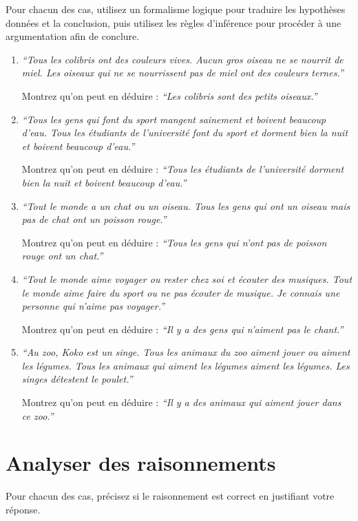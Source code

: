 \documentclass[a4paper,11pt]{article}
\begin{document}
Pour chacun des cas, utilisez un formalisme logique pour traduire les hypothèses données et la conclusion, puis utilisez les règles d'inférence pour procéder à une argumentation afin de conclure.

\begin{enumerate}
\item \emph{``Tous les colibris ont des couleurs vives. Aucun gros oiseau ne se nourrit de miel. Les oiseaux qui ne se nourrissent pas de miel ont des couleurs ternes.''}

Montrez qu'on peut en déduire : \emph{``Les colibris sont des petits oiseaux.''}

\item \emph{``Tous les gens qui font du sport mangent sainement et boivent beaucoup d'eau. Tous les étudiants de l'université font du sport et dorment bien la nuit et boivent beaucoup d'eau.''}

Montrez qu'on peut en déduire : \emph{``Tous les étudiants de l'université dorment bien la nuit et boivent beaucoup d'eau.''}

\item \emph{``Tout le monde a un chat ou un oiseau. Tous les gens qui ont un oiseau mais pas de chat ont un poisson rouge.''}

Montrez qu'on peut en déduire : \emph{``Tous les gens qui n'ont pas de poisson rouge ont un chat.''}

\item \emph{``Tout le monde aime voyager ou rester chez soi et écouter des musiques. Tout le monde aime faire du sport ou ne pas écouter de musique. Je connais une personne qui n'aime pas voyager.''}

Montrez qu'on peut en déduire : \emph{``Il y a des gens qui n'aiment pas le chant.''}

\item \emph{``Au zoo, Koko est un singe. Tous les animaux du zoo aiment jouer ou aiment les légumes. Tous les animaux qui aiment les légumes aiment les légumes. Les singes détestent le poulet.''}

Montrez qu'on peut en déduire : \emph{``Il y a des animaux qui aiment jouer dans ce zoo.''}
\end{enumerate}

\section{Analyser des raisonnements}

Pour chacun des cas, précisez si le raisonnement est correct en justifiant votre réponse.
\end{document}
